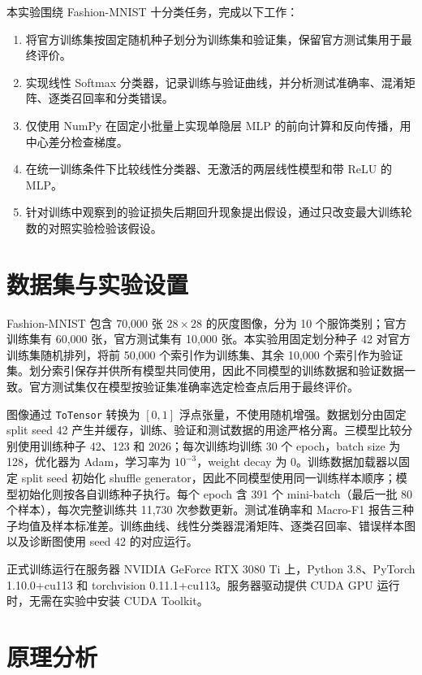 \documentclass[dvipsnames,svgnames,a4paper,11pt]{article}
\begin{document}
本实验围绕 Fashion-MNIST 十分类任务，完成以下工作：
\begin{enumerate}[leftmargin=2em]
  \item 将官方训练集按固定随机种子划分为训练集和验证集，保留官方测试集用于最终评价。
  \item 实现线性 Softmax 分类器，记录训练与验证曲线，并分析测试准确率、混淆矩阵、逐类召回率和分类错误。
  \item 仅使用 NumPy 在固定小批量上实现单隐层 MLP 的前向计算和反向传播，用中心差分检查梯度。
  \item 在统一训练条件下比较线性分类器、无激活的两层线性模型和带 ReLU 的 MLP。
  \item 针对训练中观察到的验证损失后期回升现象提出假设，通过只改变最大训练轮数的对照实验检验该假设。
\end{enumerate}

\section{数据集与实验设置}

Fashion-MNIST 包含 70,000 张 $28\times28$ 的灰度图像，分为 10 个服饰类别；官方训练集有 60,000 张，官方测试集有 10,000 张\cite{fashionmnist}。本实验用固定划分种子 42 对官方训练集随机排列，将前 50,000 个索引作为训练集、其余 10,000 个索引作为验证集。划分索引保存并供所有模型共同使用，因此不同模型的训练数据和验证数据一致。官方测试集仅在模型按验证集准确率选定检查点后用于最终评价。

图像通过 \texttt{ToTensor} 转换为 $[0,1]$ 浮点张量，不使用随机增强。数据划分由固定 split seed 42 产生并缓存，训练、验证和测试数据的用途严格分离。三模型比较分别使用训练种子 42、123 和 2026；每次训练均训练 30 个 epoch，batch size 为 128，优化器为 Adam，学习率为 $10^{-3}$，weight decay 为 0。训练数据加载器以固定 split seed 初始化 shuffle generator，因此不同模型使用同一训练样本顺序；模型初始化则按各自训练种子执行。每个 epoch 含 391 个 mini-batch（最后一批 80 个样本），每次完整训练共 11,730 次参数更新。测试准确率和 Macro-F1 报告三种子均值及样本标准差。训练曲线、线性分类器混淆矩阵、逐类召回率、错误样本图以及诊断图使用 seed 42 的对应运行。

正式训练运行在服务器 NVIDIA GeForce RTX 3080 Ti 上，Python 3.8、PyTorch 1.10.0+cu113 和 torchvision 0.11.1+cu113。服务器驱动提供 CUDA GPU 运行时，无需在实验中安装 CUDA Toolkit。

\section{原理分析}
\end{document}
